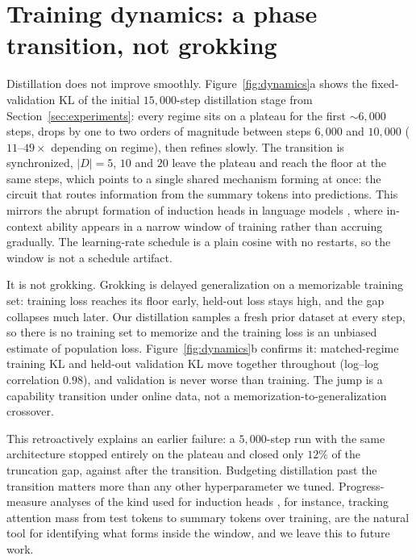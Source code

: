 \documentclass[11pt]{article}
\newcommand{\Dloc}{D}
\begin{document}
\section{Training dynamics: a phase transition, not grokking}
\label{app:dynamics}

Distillation does not improve smoothly. Figure~\ref{fig:dynamics}a shows
the fixed-validation KL of the initial $15{,}000$-step distillation
stage from
Section~\ref{sec:experiments}: every regime sits on a plateau for the
first $\sim\!6{,}000$ steps, drops by one to two orders of magnitude
between steps $6{,}000$ and $10{,}000$ ($11$--$49\times$ depending on
regime), then refines slowly. The transition is synchronized,
$|\Dloc| = 5$, $10$ and $20$ leave the plateau and reach the floor at the
same steps, which points to a single shared mechanism forming at once:
the circuit that routes information from the summary tokens into
predictions. This mirrors the abrupt formation of induction heads in
language models \citep{olsson2022induction}, where in-context ability
appears in a narrow window of training rather than accruing gradually. The
learning-rate schedule is a plain cosine with no restarts, so the window is
not a schedule artifact.

It is not grokking. Grokking \citep{power2022grokking} is delayed
generalization on a memorizable training set: training loss reaches its
floor early, held-out loss stays high, and the gap collapses much later.
Our distillation samples a fresh prior dataset at every step, so there is
no training set to memorize and the training loss is an unbiased estimate
of population loss. Figure~\ref{fig:dynamics}b confirms it: matched-regime
training KL and held-out validation KL move together throughout (log--log
correlation $0.98$), and validation is never worse than training. The jump
is a capability transition under online data, not a
memorization-to-generalization crossover.

This retroactively explains an earlier failure: a $5{,}000$-step run with
the same architecture stopped entirely on the plateau and closed only
$12\%$ of the truncation gap, against \shortclosepct{} after the
transition. Budgeting distillation past the transition matters more than
any other hyperparameter we tuned. Progress-measure analyses of the kind
used for induction heads \citep{nanda2023progress}, for instance,
tracking attention mass from test tokens to summary tokens over training,
are the natural tool for identifying what forms inside the window, and we
leave this to future work.
\end{document}
